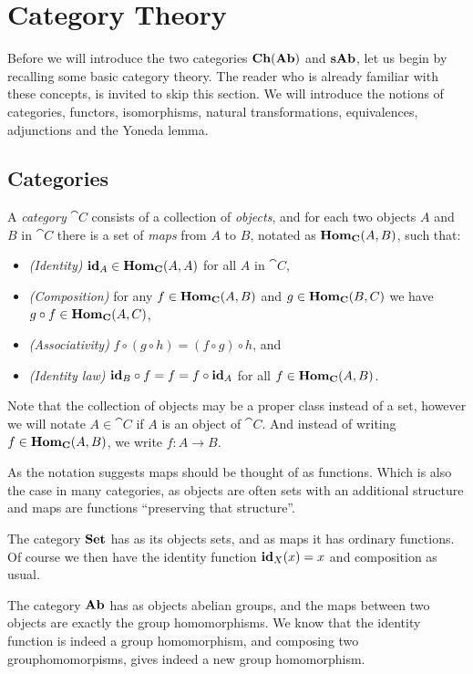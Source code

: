 \section{Category Theory}
\label{sec:Category Theory}
Before we will introduce the two categories $\mathbf{Ch}(\mathbf{Ab})$ and $\mathbf{sAb}$, let us begin by recalling some basic category theory. The reader who is already familiar with these concepts, is invited to skip this section. We will introduce the notions of categories, functors, isomorphisms, natural transformations, equivalences, adjunctions and the Yoneda lemma.

\subsection{Categories}
\begin{definition}
	A \emph{category} $\cat{C}$ consists of a collection of \emph{objects}, and for each two objects $A$ and $B$ in $\cat{C}$ there is a set of \emph{maps}  from $A$ to $B$, notated as $\mathbf{Hom}_{\mathbf{C}}(A, B)$, such that:
	\begin{itemize}
		\item \emph{(Identity)}
			$\mathbf{id}_A \in \mathbf{Hom}_{\mathbf{C}}(A, A)$ for all $A$ in $\cat{C}$,
		\item \emph{(Composition)}
			for any $f \in \mathbf{Hom}_{\mathbf{C}}(A, B)$ and $g \in \mathbf{Hom}_{\mathbf{C}}(B, C)$ we have $g \circ f \in \mathbf{Hom}_{\mathbf{C}}(A, C)$,
		\item \emph{(Associativity)}
			$f \circ (g \circ h) = (f \circ g) \circ h$, and
		\item \emph{(Identity law)}
			$\mathbf{id}_B \circ f = f = f \circ \mathbf{id}_A$ for all $f \in \mathbf{Hom}_{\mathbf{C}}(A, B)$.
	\end{itemize}
\end{definition}

Note that the collection of objects may be a proper class instead of a set, however we will notate $A \in \cat{C}$ if $A$ is an object of $\cat{C}$. And instead of writing $f \in \mathbf{Hom}_{\mathbf{C}}(A, B)$, we write $f: A \to B$.

As the notation suggests maps should be thought of as functions. Which is also the case in many categories, as objects are often sets with an additional structure and maps are functions ``preserving that structure''.

\begin{example}
	The category $\mathbf{Set}$ has as its objects sets, and as maps it has ordinary functions. Of course we then have the identity function $\mathbf{id}_X(x) = x$ and composition as usual.
\end{example}
\begin{example}
	The category $\mathbf{Ab}$ has as objects abelian groups, and the maps between two objects are exactly the group homomorphisms. We know that the identity function is indeed a group homomorphism, and composing two grouphomomorpisms, gives indeed a new group homomorphism.
\end{example}

